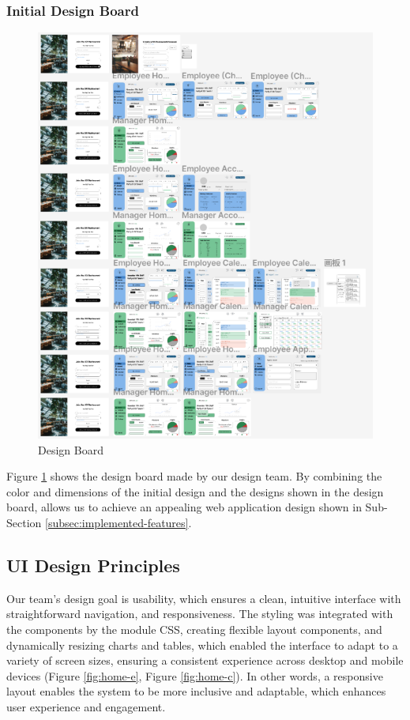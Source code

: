 \documentclass[a4paper,12pt, oneside]{report}
\begin{document}
\subsubsection{Initial Design Board}
\begin{figure}[H]
    \centering
    \includegraphics[width=1\linewidth]{images/design-board.png}
    \caption{Design Board}
    \label{fig:design-board}
\end{figure}

Figure \ref{fig:design-board} shows the design board made by our design team. By combining the color and dimensions of the initial design and the designs shown in the design board, allows us to achieve an appealing web application design shown in Sub-Section \ref{subsec:implemented-features}.

\subsection{UI Design Principles}
Our team’s design goal is usability, which ensures a clean, intuitive interface with straightforward navigation, and responsiveness. The styling was integrated with the components by the module CSS, creating flexible layout components, and dynamically resizing charts and tables, which enabled the interface to adapt to a variety of screen sizes, ensuring a consistent experience across desktop and mobile devices (Figure \ref{fig:home-e}, Figure \ref{fig:home-c}). In other words, a responsive layout enables the system to be more inclusive and adaptable, which enhances user experience and engagement.\\
\end{document}
